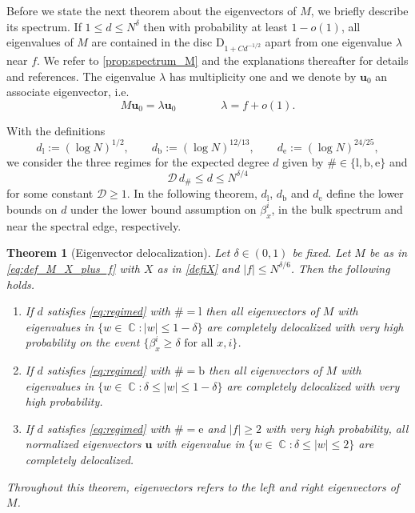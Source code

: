 \documentclass[11pt]{article}
\DeclareMathOperator{\CC}{\mathbb{C}}
\newcommand{\abs}[1]{\left| #1 \right|}
\theoremstyle{plain}
\newtheorem{thm}[thhm]{Theorem}
\theoremstyle{remark}
\numberwithin{equation}{section}
\begin{document}
	Before we state the next theorem about the eigenvectors of $M$, we briefly describe its spectrum. If $1 \le d \le N^{\delta}$ then with probability at least $1 - o(1)$, all eigenvalues of $M$ are contained in the disc $\mathrm{D}_{1 + Cd^{-1/2}}$ apart from one eigenvalue $\lambda$ near $f$. We refer to \cref{prop:spectrum_M} and the explanations thereafter for details and references. 
	 The eigenvalue $\lambda$ has multiplicity one and we denote by $\mathbf{u}_0$ an 
	 associate eigenvector, i.e.\ 
	 \begin{equation} \label{eq:eigenvector_u_0} 
	 M \mathbf{u}_0 = \lambda \mathbf{u}_0 \qquad \qquad \lambda = f + o(1). 
	 \end{equation} 
	 
	 With the definitions  
	 	\begin{equation} \label{eq:def_d_hash} 
	d_\mathrm{l} :=  (\log N)^{1/2}, 
	\qquad d_\mathrm{b} :=  (\log N)^{12/13}, \qquad 
	d_\mathrm{e} :=  (\log N)^{24/25}, 
	\end{equation} 
	 we consider the three regimes for the expected degree $d$ given by $\# \in \{ \mathrm{l}, \mathrm{b}, \mathrm{e}\}$ and  
	\begin{equation}\label{eq:regimed}
	\mathcal D \,  d_\# \leq  d \le N^{\delta/4}  
	\end{equation}
for some constant $\mathcal D \geq 1$.  
In the following theorem, $d_\mathrm{l}$, $d_\mathrm{b}$ and $d_\mathrm{e}$ define the lower bounds on $d$ under the lower bound assumption on $\beta_x^i$, in the bulk spectrum and near the spectral edge, respectively. 

		\begin{thm}[Eigenvector delocalization]\label{thm:condideloc}
	 Let $\delta \in (0,1)$ be fixed. Let $M$ be as in \cref{eq:def_M_X_plus_f} with $X$ as in \cref{defiX} and $\abs{f} \leq N^{\delta/6}$. Then the following holds. 
		\begin{enumerate}[label=(\roman*)]
			\item \label{item:thm_cond_deloc_small_eigenvec}
			 If $d$ satisfies \cref{eq:regimed} with $\# = \mathrm{l}$ then  all eigenvectors of $M$ with eigenvalues in $\{ w \in \CC \colon \abs{w} \le 1-\delta\}$ are completely delocalized with very high probability on the event $\{ \beta_{x}^i \ge \delta \text{ for all } x,i \}$. 
			\item 
			 If $d$ satisfies \cref{eq:regimed} with $\# = \mathrm{b}$ then all eigenvectors of $M$ with eigenvalues in $\{ w \in \CC \colon \delta \leq \abs{w} \leq 1- \delta\}$ are completely delocalized with very high probability. 
		\item\label{item:thm_cond_deloc_large_eigenvec} If $d$ satisfies \cref{eq:regimed} with $\# = \mathrm{e}$ and $|f| \ge 2 $ with very high probability, all normalized eigenvectors $\mathbf{u}$  with eigenvalue in $\{w \in \CC \colon \delta \leq \abs{w} \leq 2\}$ are completely delocalized.  
		\end{enumerate}
		Throughout this theorem, eigenvectors refers to the left and right eigenvectors of $M$. 
	\end{thm}
	
\end{document}
